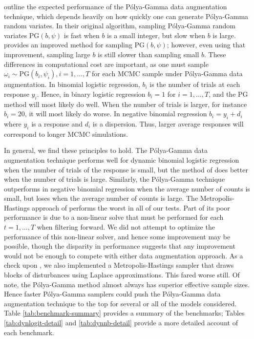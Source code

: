 \documentclass[11pt]{article}
\newcommand{\Polya}{P\'{o}lya}
\newcommand{\PG}{\text{PG}}
\begin{document}
\cite{polson-etal-2013} outline the expected performance of the \Polya-Gamma
data augmentation technique, which depends heavily on how quickly one can
generate \Polya-Gamma random variates.  In their original algorithm, sampling
\Polya-Gamma random variates $\PG(b,\psi)$ is fast when $b$ is a small integer,
but slow when $b$ is large. \cite{windle-thesis-2013} provides an improved
method for sampling $\PG(b,\psi)$; however, even using that improvement,
sampling large $b$ is still slower than sampling small $b$.  These differences
in computational cost are important, as one must sample $\omega_i \sim \PG(b_i,
\psi_i), i=1,\ldots,T$ for each MCMC sample under \Polya-Gamma data
augmentation.  In binomial logistic regression, $b_i$ is the number of trials at
each response $y_i$.  Hence, in binary logistic regression $b_i = 1$ for $i=1,
\ldots, T$, and the PG method will most likely do well.  When the number of
trials is larger, for instance $b_i = 20$, it will most likely do worse.  In
negative binomial regression $b_i = y_i + d_i$ where $y_i$ is a response and
$d_i$ is a dispersion.  Thus, larger average responses will correspond to longer
MCMC simulations.

In general, we find these principles to hold.  The \Polya-Gamma data
augmentation technique performs well for dynamic binomial logistic regression
when the number of trials of the response is small, but the method of
\cite{fussl-etal-2013} does better when the number of trials is large.
Similarly, the \Polya-Gamma technique outperforms
\cite{fruhwirth-schnatter-etal-2009} in negative binomial regression when the
average number of counts is small, but loses when the average number of counts
is large.  The Metropolis-Hastings approach of \cite{ravines-etal-2006} performs
the worst in all of our tests.  Part of its poor performance is due to a
non-linear solve that must be performed for each $t=1, \ldots, T$ when filtering
forward.  We did not attempt to optimize the performance of this non-linear
solver, and hence some improvement may be possible, though the disparity in
performance suggests that any improvement would not be enough to compete with
either data augmentation approach.  As a check upon \cite{ravines-etal-2006}, we
also implemented a Metropolis-Hastings sampler that draws blocks of disturbances
using Laplace approximations.  This fared worse still.  Of note, the
\Polya-Gamma method almost always has superior effective sample sizes.  Hence
faster \Polya-Gamma samplers could push the \Polya-Gamma data augmentation
technique to the top for several or all of the models considered.  Table
\ref{tab:benchmark-summary} provides a summary of the benchmarks;  Tables
\ref{tab:dynlogit-detail} and \ref{tab:dynnb-detail} provide a more detailed
account of each benchmark.
\end{document}
